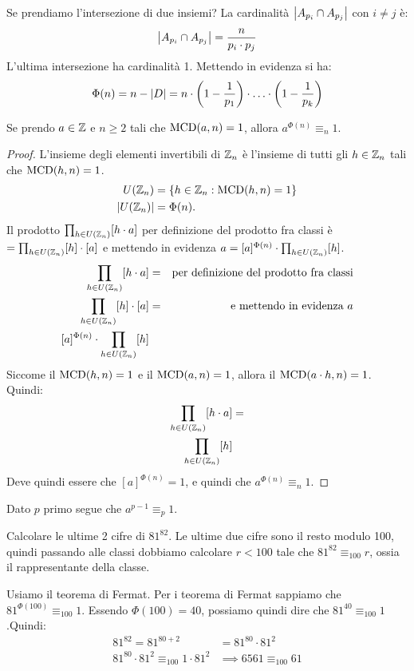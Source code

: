 Se prendiamo l'intersezione di due insiemi? La cardinalit\`a $\left\lvert{A_{p_i} \cap A_{p_j}}\right\rvert$ con $i \neq j$ \`e:
\[
\left\lvert{A_{p_i} \cap A_{p_j}}\right\rvert = \frac{n}{p_i \cdot p_j}
\]
L'ultima intersezione ha cardinalit\`a 1. Mettendo in evidenza si ha:
\[
\Phi (n) = n - \left\lvert{D}\right\rvert = n \cdot \left(1 - \frac{1}{p_1} \right) \cdot \ldots \cdot \left( 1 - \frac{1}{p_k} \right)
\]
\begin{theorem}
Se prendo $a \in \mathbb{Z}$ e $n \ge 2$ tali che $\operatorname{MCD}(a, n) = 1$, allora $a^{\Phi(n)} \equiv_n 1$. 
\end{theorem}
\begin{proof}
L'insieme degli elementi invertibili di $\mathbb{Z}_n$ \`e l'insieme di tutti gli $h \in \mathbb{Z}_n$ tali che $\operatorname{MCD}(h, n) = 1$.
\begin{align*}
U(\mathbb{Z}_n) &= \{ h \in \mathbb{Z}_n : \operatorname{MCD}(h, n) = 1 \} \\
\left\lvert{U(\mathbb{Z}_n)}\right\rvert &= \Phi(n). 
\end{align*}
Il prodotto $\prod_{h \in U(\mathbb{Z}_n)} [h \cdot a]$  per definizione del prodotto fra classi \`e $= \prod_{h \in U(\mathbb{Z}_n)} [h] \cdot [a]$ e mettendo in evidenza $a = [a]^{\Phi(n)} \cdot \prod_{h \in U(\mathbb{Z}_n)} [h]$.
\begin{align*}
\prod_{h \in U(\mathbb{Z}_n)} [h \cdot a] &= & \text{per definizione del prodotto fra classi} \\
\prod_{h \in U(\mathbb{Z}_n)} [h] \cdot [a] &= & \text{e mettendo in evidenza $a$} \\
[a]^{\Phi(n)} \cdot \prod_{h \in U(\mathbb{Z}_n)} [h] &&
\end{align*}
Siccome il $\operatorname{MCD}(h, n) = 1$ e il $\operatorname{MCD}(a, n) = 1$, allora il $\operatorname{MCD}(a \cdot h, n) = 1$. Quindi:
\begin{align*}
\prod_{h \in U(\mathbb{Z}_n)} [h \cdot a] &= \\
\prod_{h \in U(\mathbb{Z}_n)} [h] &
\end{align*}
Deve quindi essere che $[a]^{\Phi(n)} = 1 $, e quindi che $ a^{\Phi(n)} \equiv_n 1$.
\end{proof}

\begin{cor}
Dato $p$ primo segue che $a^{p-1} \equiv_p 1$.
\end{cor}

\begin{exmp}
Calcolare le ultime 2 cifre di $81^{82}$. Le ultime due cifre sono il resto modulo 100, quindi passando alle classi dobbiamo calcolare $r < 100$ tale che $81^{82} \equiv_{100} r$, ossia il rappresentante della classe.

Usiamo il teorema di Fermat. Per i teorema di Fermat sappiamo che $81^{\Phi (100)} \equiv_{100} 1$. Essendo $\Phi(100) = 40$, possiamo quindi dire che $81^{40} \equiv_{100} 1$.Quindi:
\begin{align*}
81^{82} = 81^{80 + 2} &= 81^{80} \cdot 81^{2} \\
81^{80} \cdot 81^{2} \equiv_{100} 1 \cdot 81^{2} &\implies 6561 \equiv_{100} 61
\end{align*}
\end{exmp}


